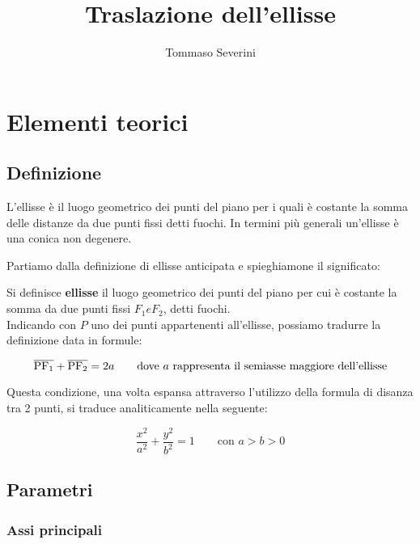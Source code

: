 \documentclass[10pt, a4paper]{article}
\title{Traslazione dell'ellisse}
\author{Tommaso Severini}
\date{}
\theoremstyle{remark}
\begin{document}
	
	\maketitle
	
	\section*{Elementi teorici}
	
	\subsection*{Definizione}
	
	L'ellisse è il luogo geometrico dei punti del piano per i quali è costante la somma delle distanze da due punti fissi detti fuochi. In termini più generali un'ellisse è una conica non degenere.
	
	Partiamo dalla definizione di ellisse anticipata e spieghiamone il significato:
	
	\begin{definition*}[Ellisse]
		Si definisce \textbf{ellisse} il luogo geometrico dei punti del piano per cui è costante la somma da due punti fissi $F_1 e F_2$, detti fuochi.\\
		
		Indicando con $P$ uno dei punti appartenenti all'ellisse, possiamo tradurre la definizione data in formule:
		
		\begin{equation*}
			\overline{\rm PF_1} + \overline{\rm PF_2} = 2a \qquad \text{dove $a$ rappresenta il semiasse maggiore dell'ellisse}
		\end{equation*}
	\end{definition*}

	Questa condizione, una volta espansa attraverso l'utilizzo della formula di disanza tra 2 punti, si traduce analiticamente nella seguente:
	
	\begin{equation}
		\frac{x^2}{a^2} + \frac{y^2}{b^2} = 1 \qquad \text{con $a>b>0$}
	\end{equation}

	\subsection*{Parametri}
	
	\subsubsection*{Assi principali}
	
\end{document}
